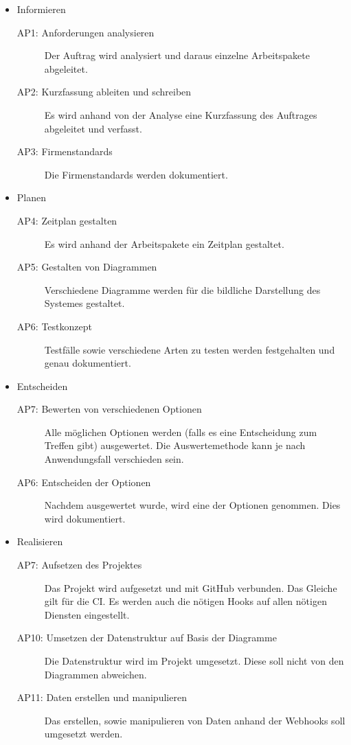 \begin{itemize}
    \item Informieren
    \begin{description}
        \item[AP1: Anforderungen analysieren] Der Auftrag wird analysiert und daraus einzelne Arbeitspakete abgeleitet. 
        \item[AP2: Kurzfassung ableiten und schreiben] Es wird anhand von der Analyse eine Kurzfassung des Auftrages abgeleitet und verfasst.
        \item[AP3: Firmenstandards] Die Firmenstandards werden dokumentiert.
    \end{description}
    \item Planen
    \begin{description}
        \item[AP4: Zeitplan gestalten] Es wird anhand der Arbeitspakete ein Zeitplan gestaltet.
        \item[AP5: Gestalten von Diagrammen] Verschiedene Diagramme werden für die bildliche Darstellung des Systemes gestaltet.
        \item[AP6: Testkonzept] Testfälle sowie verschiedene Arten zu testen werden festgehalten und genau dokumentiert.
    \end{description}
    \item Entscheiden
    \begin{description}
        \item[AP7: Bewerten von verschiedenen Optionen] Alle möglichen Optionen werden (falls es eine Entscheidung zum Treffen gibt) ausgewertet. Die Auswertemethode kann je nach Anwendungsfall verschieden sein.
        \item[AP6: Entscheiden der Optionen] Nachdem ausgewertet wurde, wird eine der Optionen genommen. Dies wird dokumentiert.
    \end{description}
    \item Realisieren
    \begin{description}
        \item[AP7: Aufsetzen des Projektes] Das Projekt wird aufgesetzt und mit GitHub verbunden. Das Gleiche gilt für die CI. \newline
        Es werden auch die nötigen \gls{Hooks} auf allen nötigen Diensten eingestellt.
        \item[AP10: Umsetzen der Datenstruktur auf Basis der Diagramme] Die Datenstruktur wird im Projekt umgesetzt. Diese soll nicht von den Diagrammen abweichen.
        \item[AP11: Daten erstellen und manipulieren] Das erstellen, sowie manipulieren von Daten anhand der Webhooks soll umgesetzt werden.

\end{description}
\end{itemize}
